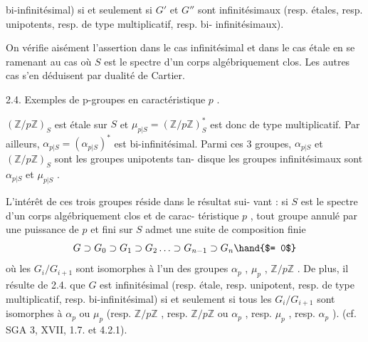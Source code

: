 
bi-infinitésimal) si et seulement si $G'$ et $G''$ sont infinitésimaux
(resp. étales, resp. unipotents, resp. de type multiplicatif, resp. bi-%
infinitésimaux).

On vérifie aisément l'assertion dans le cas infinitésimal
et dans le cas étale en se ramenant au cas où $S$ est le spectre d'un
corps algébriquement clos. Les autres cas s'en déduisent par dualité de
Cartier.

2.4. Exemples de p-groupes en caractéristique $p$ .

$(\mathbb{Z}/p\mathbb{Z})_S$ est étale sur $S$ et $\mu_{p|S} = (\mathbb{Z}/p\mathbb{Z})^*_S$ est donc de
type multiplicatif. Par ailleurs, $\alpha_{p|S} = (\alpha_{p|S})^*$ est bi-infinitésimal.
Parmi ces 3 groupes, $\alpha_{p|S}$ et $(\mathbb{Z}/p\mathbb{Z})_S$ sont les groupes unipotents tan-%
disque les groupes infinitésimaux sont $\alpha_{p|S}$ et $\mu_{p|S}$ .

L'intérêt de ces trois groupes réside dans le résultat sui-%
vant : si $S$ est le spectre d'un corps algébriquement clos et de carac-%
téristique $p$ , tout groupe annulé par une puissance de $p$ et fini sur
$S$ admet une suite de composition finie
\margin{$\times$}
\[ G \supset G_0 \supset G_1 \supset G_2 \ldots \supset G_{n-1} \supset G_n \hand{$= 0$} \]
où les $G_i/G_{i+1}$ sont isomorphes à l'un des groupes $\alpha_p$ , $\mu_p$ , $\mathbb{Z}/p\mathbb{Z}$ . De
plus, il résulte de 2.4. que $G$ est infinitésimal (resp. étale, resp.
unipotent, resp. de type multiplicatif, resp. bi-infinitésimal) si et
seulement si tous les $G_i/G_{i+1}$ sont isomorphes à $\alpha_p$ ou $\mu_p$ (resp.
$\mathbb{Z}/p\mathbb{Z}$ , resp. $\mathbb{Z}/p\mathbb{Z}$ ou $\alpha_p$ , resp. $\mu_p$ , resp. $\alpha_p$ ). (cf. SGA 3, XVII, 1.7.
et 4.2.1).

